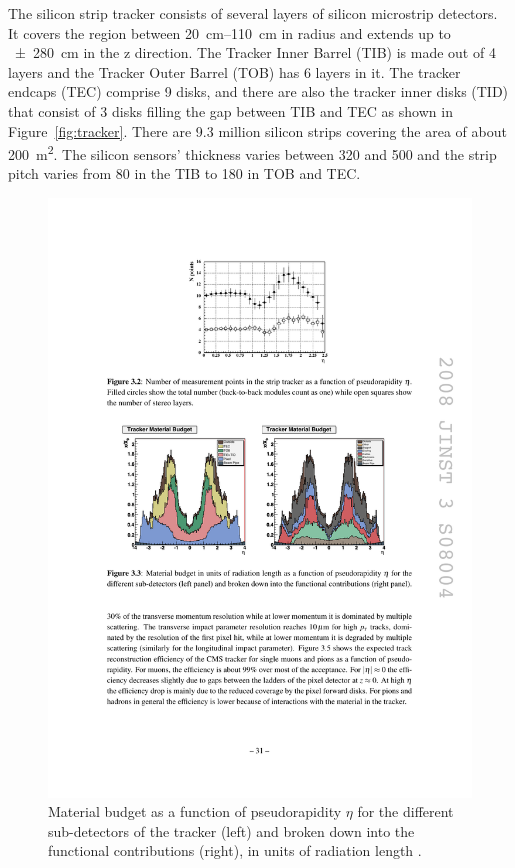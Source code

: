 The silicon strip tracker consists of several layers of silicon microstrip detectors. It covers the region between
\SIrange{20}{110}{\cm} in radius and extends up to \SI{+-280}{\cm} in the z direction. The Tracker Inner Barrel (TIB) is
made out of 4 layers and the Tracker Outer Barrel (TOB) has 6 layers in it. The tracker endcaps (TEC) comprise 9 disks,
and there are also the tracker inner disks (TID) that consist of 3 disks filling the gap between TIB and TEC as shown in
Figure~\ref{fig:tracker}. There are \num{9.3} million silicon strips covering the area of about \SI{200}{\m\squared}.
The silicon sensors' thickness varies between \num{320} and \SI{500}{\micron} and the strip pitch varies from
\SI{80}{\micron} in the TIB to \SI{180}{\micron} in TOB and TEC.

\begin{figure}[!htbp]
  \centering
  \leavevmode
  \includegraphics[width=\columnwidth]{tracker_material_budget}
  \caption{Material budget as a function of pseudorapidity $\eta$ for the different sub-detectors of the tracker
  (left) and broken down into the functional contributions (right), in units of radiation length \autocite{CMS}.}
  \label{fig:tracker_material_budget}
\end{figure}

